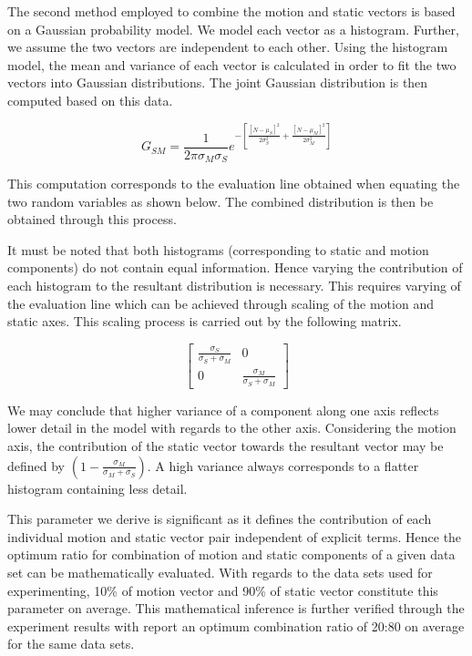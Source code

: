 \documentclass{article}
\begin{document}
The second method employed to combine the motion and static vectors is based on a Gaussian probability model. We model each vector as a histogram. Further, we assume the two vectors are independent to each other. Using the histogram model, the mean and variance of each vector is calculated in order to fit the two vectors into Gaussian distributions. The joint Gaussian distribution is then computed based on this data.

\begin{equation}
G_{SM}= \frac{1}{2\pi\sigma_M\sigma_S} e^{-\left[\frac{[N-\mu_S]^2}{2\sigma_S^2}+ \frac{[N-\mu_M]^2}{2\sigma_M^2} \right]}
\end{equation}

This computation corresponds to the evaluation line obtained when equating the two random variables as shown below. The combined distribution is then be obtained through this process.

It must be noted that both histograms (corresponding to static and motion components) do not contain equal information. Hence varying the contribution of each histogram to the resultant distribution is necessary. This requires varying of the evaluation line which can be achieved through scaling of the motion and static axes. This scaling process is carried out by the following matrix.


\[
\begin{bmatrix}
    \frac {\sigma_S}{\sigma_S + \sigma_M} & 0  \\
    0 & \frac {\sigma_M}{\sigma_S + \sigma_M}
\end{bmatrix}
\]

We may conclude that higher variance of a component along one axis reflects lower detail in the model with regards to the other axis. Considering the motion axis, the contribution of the static vector towards the resultant vector may be defined by $(1-\frac{\sigma_M}{\sigma_M+\sigma_S})$. A high variance always corresponds to a flatter histogram containing less detail.

This parameter we derive is significant as it defines the contribution of each individual motion and static vector pair independent of explicit terms. Hence the optimum ratio for combination of motion and static components of a given data set can be mathematically evaluated. With regards to the data sets used for experimenting, 10\% of motion
vector and 90\% of static vector constitute this parameter on average. This mathematical inference is further verified through the experiment results with report an optimum combination ratio of 20:80 on average for the same data sets.
\end{document}
